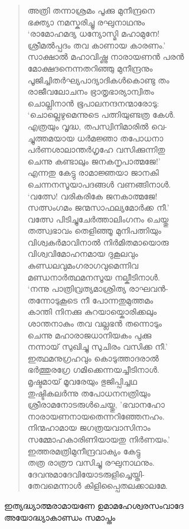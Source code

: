 \begin{verse}
അത്രി തന്നാശ്രമം പൂക്കു മുനീന്ദ്രനെ\\
ഭക്ത്യാ നമസ്കരിച്ചൂ രഘുനാഥനും\\
‘രാമോഹമദ്യ ധന്യോസ്മി മഹാമുനേ!\\
ശ്രീമല്‍പ്പദം തവ കാണായ കാരണം.’\\
സാക്ഷാല്‍ മഹാവിഷ്ണു നാരായണന്‍ പരന്‍\\
മോക്ഷദനെന്നതറിഞ്ഞു മുനീന്ദ്രനും\\
പൂജിച്ചിതര്‍ഘ്യപാദ്യാദികള്‍കൊണ്ടു തം\\
രാജീവലോചനം ഭ്രാതൃഭാര്യാന്വിതം\\
ചൊല്ലിനാന്‍ ഭൂപാലനന്ദനന്മാരോടു:\\
‘ചൊല്ലെഴുമെന്നുടെ പത്നിയുണ്ടത്ര കേള്‍.\\
എത്രയും വൃദ്ധ, തപസ്വിനിമാരില്‍ വെ-\\
ച്ചുത്തമയായ ധര്‍മജ്ഞാ തപോധനാ\\
പര്‍ണശാലാന്തര്‍ഗൃഹേ വസിക്കുന്നിതു\\
ചെന്നു കണ്ടാലും ജനകനൃപാത്മജേ!’\\
എന്നതു കേട്ടു രാമാജ്ഞയാ ജാനകി\\
ചെന്നനസൂയാപദങ്ങള്‍ വണങ്ങിനാള്‍.\\
‘വത്സേ! വരികരികേ ജനകാത്മജേ!\\
സത്സംഗമം ജന്മസാഫല്യമോര്‍ക്ക നീ.’\\
വത്സേ പിടിച്ചുചേര്‍ത്താലിംഗനം ചെയ്തു\\
തത്സ്വഭാവം തെളിഞ്ഞൂ മുനിപത്നിയും\\
വിശ്വകര്‍മാവിനാല്‍ നിര്‍മിതമായൊരു\\
വിശ്വവിമോഹനമായ ദുകൂലവും\\
കുണ്ഡലവുമംഗരാഗവുമെന്നിവ\\
മണ്ഡനാര്‍ത്ഥമനസൂയ നല്കീടിനാള്‍.\\
‘നന്നു പാത്രിവ്രത്യമാശ്രിത്യ രാഘവന്‍-\\
തന്നോടുകൂടെ നീ പോന്നതുമുത്തമം\\
കാന്തി നിനക്കു കുറയായ്കൊരിക്കലും\\
ശാന്തനാകും തവ വല്ലഭന്‍ തന്നൊടും\\
ചെന്നു മഹാരാജധാനിയകം പുക്കു\\
നന്നായ് സുഖിച്ചു സുചിരം വസിക്ക നീ.’\\
ഇത്ഥമനുഗ്രഹവും കൊടുത്താദരാല്‍\\
ഭര്‍ത്തുരഗ്രേ ഗമിക്കെന്നയച്ചീടിനാള്‍.\\
മൃഷ്ടമായ് മൂവരേയും ഭുജിപ്പിച്ചഥ\\
തുഷ്ടികലര്‍ന്നു തപോധനനത്രിയും\\
ശ്രീരാമനോടരുള്‍ചെയ്തു, ’ഭവാനഹോ\\
നാരായണനായതെന്നറിഞ്ഞേനഹം.\\
നിന്മഹാമായ ജഗത്രയവാസിനാം\\
സമ്മോഹകാരിണിയായതു നിര്‍ണയം.’\\
ഇത്തരമത്രിമുനീന്ദ്രവാക്യം കേട്ടു\\
തത്ര രാത്രൗ വസിച്ചു രഘുനാഥനും.\\
ദേവനുമാദേവിയോടരുളിച്ചെയ്തി-\\
തേവമെന്നാള്‍ കിളിപ്പൈതലക്കാലമേ.
\end{verse}

\begin{center}
ഇത്യദ്ധ്യാത്മരാമായണേ ഉമാമഹേശ്വരസംവാദേ\\
അയോദ്ധ്യാകാണ്ഡം സമാപ്തം
\end{center}


